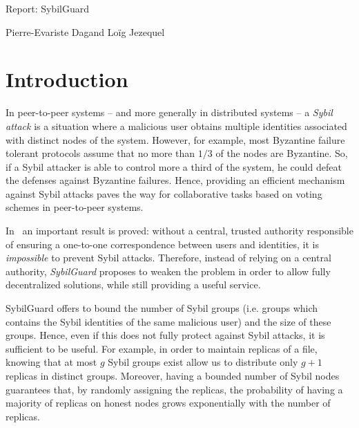 \documentclass[a4paper,11pt]{article}
\begin{document}
\begin{center}
  {\Large Report: SybilGuard}
\end{center}
\begin{center}
  {\large Pierre-Evariste {\sc Dagand} \qquad Loïg {\sc Jezequel}}
\end{center}


\section*{Introduction}


In peer-to-peer systems -- and more generally in distributed systems
-- a \emph{Sybil attack} is a situation where a malicious user obtains
multiple identities associated with distinct nodes of the system.
However, for example, most Byzantine failure tolerant protocols assume
that no more than $1/3$ of the nodes are Byzantine.  So, if a Sybil
attacker is able to control more a third of the system, he could
defeat the defenses against Byzantine failures.  Hence, providing an
efficient mechanism against Sybil attacks paves the way for
collaborative tasks based on voting schemes in peer-to-peer systems.


In~\cite{douceur} an important result is proved: without a central,
trusted authority responsible of ensuring a one-to-one correspondence
between users and identities, it is \emph{impossible} to prevent Sybil
attacks. Therefore, instead of relying on a central authority,
\emph{SybilGuard} proposes to weaken the problem in order to allow
fully decentralized solutions, while still providing a useful service.


SybilGuard offers to bound the number of Sybil groups (i.e. groups
which contains the Sybil identities of the same malicious user) and
the size of these groups.  Hence, even if this does not fully protect
against Sybil attacks, it is sufficient to be useful.  For example, in
order to maintain replicas of a file, knowing that at most $g$ Sybil
groups exist allow us to distribute only $g+1$ replicas in distinct
groups.  Moreover, having a bounded number of Sybil nodes guarantees
that, by randomly assigning the replicas, the probability of having a
majority of replicas on honest nodes grows exponentially with the
number of replicas.
\end{document}
